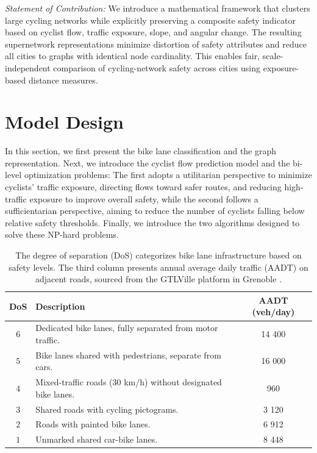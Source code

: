 \documentclass[lettersize,journal]{IEEEtran}
\begin{document}
\textit{Statement of Contribution:} We introduce a mathematical framework that clusters large cycling networks while explicitly preserving a composite safety indicator based on cyclist flow, traffic exposure, slope, and angular change. The resulting supernetwork representations minimize distortion of safety attributes and reduce all cities to graphs with identical node cardinality. This enables fair, scale-independent comparison of cycling-network safety across cities using exposure-based distance measures.



\section{Model Design}
\label{model_design}
In this section, we first present the bike lane classification and the graph representation. Next, we introduce the cyclist flow prediction model and the bi-level optimization problems: The first adopts a utilitarian perspective to minimize cyclists' traffic exposure, directing flows toward safer routes, and reducing high-traffic exposure to improve overall safety, while the second follows a sufficientarian perspective, aiming to reduce the number of cyclists falling below relative safety thresholds. Finally, we introduce the two algorithms designed to solve these NP-hard problems.



\begin{table}[t]
\centering
\vspace{0.2cm}
\begin{tabular}{|c|p{5cm}|c|}
\hline
\textbf{DoS}   & \textbf{Description} & \textbf{AADT (veh/day)} \\
\hline
$6$  & Dedicated bike lanes, fully separated from motor traffic. & 14 400 \\

$5$  & Bike lanes shared with pedestrians, separate from cars. & 16 000 \\ 

$4$  & Mixed-traffic roads (30 km/h) without designated bike lanes. & 960  \\

$3$  & Shared roads with cycling pictograms. & 3 120 \\

$2$  & Roads with painted bike lanes.  & 6 912 \\

$1$  & Unmarked shared car-bike lanes. & 8 448 \\
\hline
\end{tabular}
\caption{\footnotesize The degree of separation (DoS) categorizes bike lane infrastructure based on safety levels. The third column presents annual average daily traffic (AADT) on adjacent roads, sourced from the GTLVille platform in Grenoble \cite{gtlville2024}.}
\label{dos_table}
\end{table}
\end{document}
